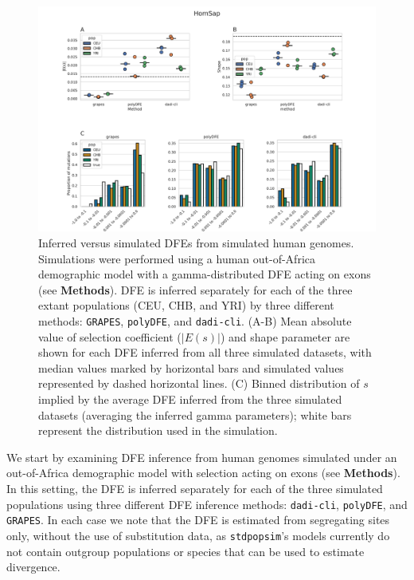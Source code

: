 \documentclass[hidelinks]{article}
\newcommand{\stdpopsim}{\texttt{stdpopsim}\xspace}
\newcommand{\polydfe}{\texttt{polyDFE}\xspace}
\newcommand{\dadicli}{\texttt{dadi-cli}\xspace}
\newcommand{\grapes}{\texttt{GRAPES}\xspace}
\begin{document}
    \begin{figure}[b!]
        \centering
        \includegraphics[width=\linewidth]{figures/HomSap/OOA/HomSap_discrete_DFE}
        \caption{Inferred versus simulated DFEs from simulated human genomes.
        Simulations were performed using a human out-of-Africa demographic model with a gamma-distributed DFE
        acting on exons (see \textbf{Methods}).
        DFE is inferred separately for each of the three extant populations (CEU, CHB, and YRI)
        by three different methods: \grapes, \polydfe , and \dadicli.
        (A-B) Mean absolute value of selection coefficient ($\lvert E(s) \rvert $) and shape parameter are
        shown for each DFE inferred from all three simulated datasets,
        with median values marked by horizontal bars
        and simulated values represented by dashed horizontal lines.
        (C) Binned distribution of $s$ implied by the average DFE inferred from the three simulated datasets (averaging the inferred gamma parameters);
        white bars represent the distribution used in the simulation.
        }
        \label{fig:homsap-dfe.ooa}
    \end{figure}

 

    We start by examining DFE inference from human genomes simulated under an out-of-Africa demographic model
    with selection acting on exons (see \textbf{Methods}).
    In this setting, the DFE is inferred separately for each of the three simulated populations
    using three different DFE inference methods: \dadicli \citep{Huang2023}, \polydfe \citep{tataru2020polydfe}, 
    and \grapes \citep{galtier2016adaptive}.
    In each case we note that the DFE is estimated from segregating sites only,
    without the use of substitution data, as \stdpopsim's models currently do not
    contain outgroup populations or species that can be used to estimate divergence.
     
\end{document}
